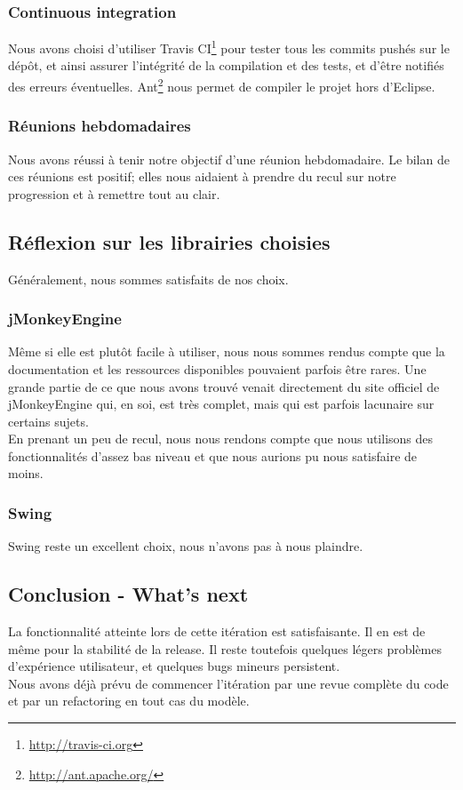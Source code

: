 	\subsubsection{Continuous integration}
	Nous avons choisi d'utiliser Travis CI\footnote{\url{http://travis-ci.org}}
	pour tester tous les commits pushés sur le dépôt, et ainsi assurer
	l'intégrité de la compilation et des tests, et d'être notifiés des erreurs
	éventuelles. Ant\footnote{\url{http://ant.apache.org/}} nous permet de
	compiler le projet hors d'Eclipse.

	\subsubsection{Réunions hebdomadaires}
	Nous avons réussi à tenir notre objectif d'une réunion hebdomadaire. Le 
	bilan de ces réunions est positif; elles nous aidaient à prendre du 
	recul sur notre progression et à remettre tout au clair. 

\subsection{Réflexion sur les librairies choisies}

	Généralement, nous sommes satisfaits de nos choix.

	\subsubsection{jMonkeyEngine}
	Même si elle est plutôt facile à utiliser, nous nous sommes rendus compte
	que la documentation et les ressources disponibles pouvaient parfois être
	rares. Une grande partie de ce que nous avons trouvé venait directement 
	du site officiel de jMonkeyEngine qui, en soi, est très complet, mais qui
	est parfois lacunaire sur certains sujets.\\

	En prenant un peu de recul, nous nous rendons compte que nous utilisons
	des fonctionnalités d'assez bas niveau et que nous aurions pu nous 
	satisfaire de moins.

	\subsubsection{Swing}
	Swing reste un excellent choix, nous n'avons pas à nous plaindre.

\subsection{Conclusion - What's next}

La fonctionnalité atteinte lors de cette itération est satisfaisante. Il en est
de même pour la stabilité de la release. Il reste toutefois quelques légers
problèmes d'expérience utilisateur, et quelques bugs mineurs persistent.\\

Nous avons déjà prévu de commencer l'itération par une revue complète du code et
par un refactoring en tout cas du modèle.
